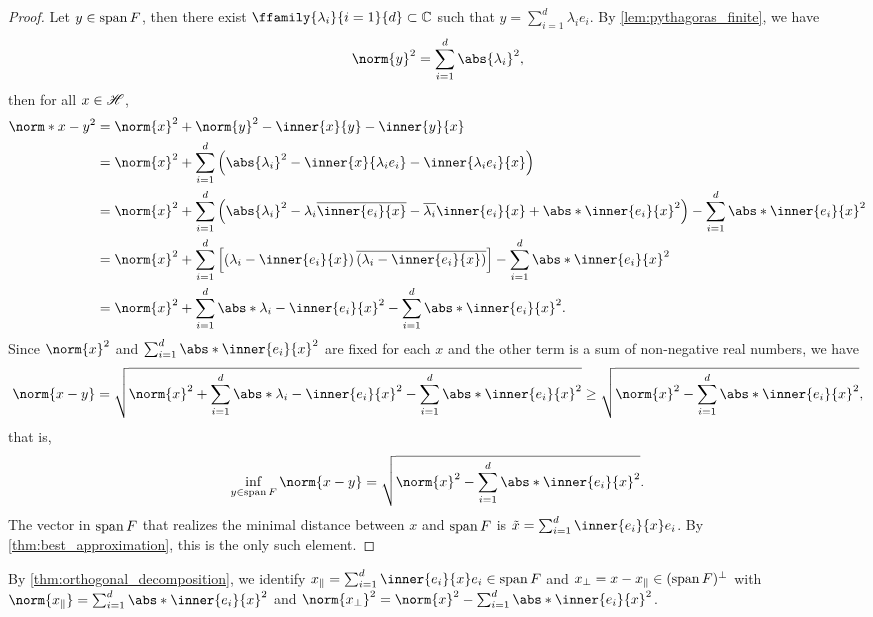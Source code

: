 \begin{proof}
    Let \(y \in \operatorname{span} F\), then there exist \(\ffamily{\lambda_i}{i=1}{d} \subset \mathbb{C}\) such that \(y = \sum_{i=1}^d \lambda_i e_i\). By \cref{lem:pythagoras_finite}, we have
    \begin{equation*}
        \norm{y}^2 = \sum_{i = 1}^d \abs{\lambda_i}^2,
    \end{equation*}
    then for all \(x \in \mathscr{H}\),
    \begin{align*}
        \norm*{x - y}^2 &= \norm{x}^2 + \norm{y}^2 - \inner{x}{y} - \inner{y}{x}\\
                        &= \norm{x}^2 + \sum_{i=1}^d \left(\abs{\lambda_i}^2 - \inner{x}{\lambda_i e_i} - \inner{\lambda_i e_i}{x}\right)\\
                        &= \norm{x}^2 + \sum_{i=1}^d \left(\abs{\lambda_i}^2 - \lambda_i\conj{\inner{e_i}{x}} - \conj{\lambda_i}\inner{e_i}{x} + \abs*{\inner{e_i}{x}}^2\right) - \sum_{i=1}^d \abs*{\inner{e_i}{x}}^2\\
                        &= \norm{x}^2 + \sum_{i = 1}^d \left[\left(\lambda_i - \inner{e_i}{x}\right)\conj{\left(\lambda_i - \inner{e_i}{x}\right)}\right] - \sum_{i=1}^d \abs*{\inner{e_i}{x}}^2\\
                        &= \norm{x}^2 + \sum_{i=1}^d \abs*{\lambda_i - \inner{e_i}{x}}^2 - \sum_{i=1}^d \abs*{\inner{e_i}{x}}^2.
    \end{align*}
    Since \(\norm{x}^2\) and \(\sum_{i=1}^d\abs*{\inner{e_i}{x}}^2\) are fixed for each \(x\) and the other term is a sum of non-negative real numbers, we have
    \begin{equation*}
        \norm{x - y} = \sqrt{\norm{x}^2 + \sum_{i=1}^d \abs*{\lambda_i - \inner{e_i}{x}}^2 - \sum_{i=1}^d \abs*{\inner{e_i}{x}}^2} \geq \sqrt{\norm{x}^2 - \sum_{i=1}^d \abs*{\inner{e_i}{x}}^2},
    \end{equation*}
    that is,
    \begin{equation*}
        \inf_{y \in \lspan{F}} \norm{x - y} = \sqrt{\norm{x}^2 - \sum_{i=1}^d \abs*{\inner{e_i}{x}}^2}.
    \end{equation*}
    The vector in \(\operatorname{span}{F}\) that realizes the minimal distance between \(x\) and \(\operatorname{span}{F}\) is \(\tilde{x} = \sum_{i=1}^d \inner{e_i}{x} e_i\). By \cref{thm:best_approximation}, this is the only such element.
\end{proof}
\begin{remark}
    By \cref{thm:orthogonal_decomposition}, we identify \(x_\parallel = \sum_{i=1}^d \inner{e_i}{x}e_i \in \lspan{F}\) and \(x_\perp = x - x_\parallel \in (\operatorname{span}{F})^\perp\) with \(\norm{x_\parallel} = \sum_{i=1}^d \abs*{\inner{e_i}{x}}^2\) and \(\norm{x_\perp}^2 = \norm{x}^2 - \sum_{i=1}^d \abs*{\inner{e_i}{x}}^2\).
\end{remark}

